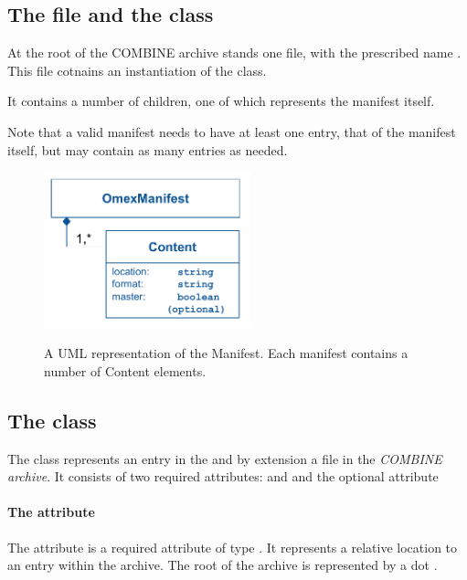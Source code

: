 \newpage
\subsection{The  file and the  class}
\label{manifest-class}

At the root of the COMBINE archive stands one file, with the prescribed name . This file cotnains an instantiation of the \OmexManifest class. 

It contains a number of \Content children, one of which represents the manifest itself. 

Note that a valid manifest needs to have at least one entry, that of the manifest itself, but may 
contain as many entries as needed. 

\begin{figure}[h!]
  \centering
  \includegraphics[width=6cm]{images/OmexManifest.pdf}\\
  \caption{A UML representation of the Manifest. Each manifest contains a number
	of Content elements.}
  \label{fig:combine_uml}
\end{figure}

\subsection{The  class}
\label{content-class}
The \Content class represents an entry in the \OmexManifest and by 
extension a file in the \textit{COMBINE archive}. It consists of two 
required attributes:  and  and the 
optional attribute  

\paragraph{The  attribute}
The  attribute is a required attribute of type 
. It represents a relative location to an entry within the 
archive. The root of the archive is represented by a dot . 

